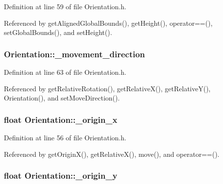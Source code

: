 Definition at line 59 of file Orientation.\-h.



Referenced by get\-Aligned\-Global\-Bounds(), get\-Height(), operator==(), set\-Global\-Bounds(), and set\-Height().

\hypertarget{classOrientation_a548b6090029335848c21f40f87811df9}{
\subsubsection[{\-\_\-movement\-\_\-direction}]{ Orientation\-::\-\_\-movement\-\_\-direction\hspace{0.3cm}{\ttfamily [private]}}}\label{classOrientation_a548b6090029335848c21f40f87811df9}


Definition at line 63 of file Orientation.\-h.



Referenced by get\-Relative\-Rotation(), get\-Relative\-X(), get\-Relative\-Y(), Orientation(), and set\-Move\-Direction().

\hypertarget{classOrientation_ae7ee03cf18222bb76433d577936d610e}{
\subsubsection[{\-\_\-origin\-\_\-x}]{\setlength{\rightskip}{0pt plus 5cm}float Orientation\-::\-\_\-origin\-\_\-x\hspace{0.3cm}{\ttfamily [private]}}}\label{classOrientation_ae7ee03cf18222bb76433d577936d610e}


Definition at line 56 of file Orientation.\-h.



Referenced by get\-Origin\-X(), get\-Relative\-X(), move(), and operator==().

\hypertarget{classOrientation_affb8b0093da380404f865772bf52b3eb}{
\subsubsection[{\-\_\-origin\-\_\-y}]{\setlength{\rightskip}{0pt plus 5cm}float Orientation\-::\-\_\-origin\-\_\-y\hspace{0.3cm}{\ttfamily [private]}}}\label{classOrientation_affb8b0093da380404f865772bf52b3eb}


